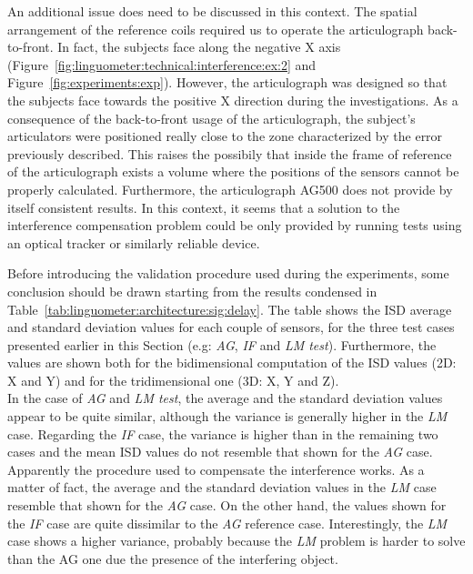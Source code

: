 
An additional issue does need to be discussed in this context. 
The spatial arrangement of the reference coils required us to operate the
articulograph back-to-front.
In fact, the subjects face along the negative X
axis (Figure~\ref{fig:linguometer:technical:interference:ex:2} and
Figure~\ref{fig:experiments:exp}).
However, the articulograph was designed so that the subjects face
towards the positive X direction during the investigations.
As a consequence of the back-to-front usage of the articulograph,
the subject's articulators were positioned really close to the zone
characterized by the error previously described.
This raises the possibily
that inside the frame of reference of the articulograph exists a volume where
the positions of the sensors cannot be properly calculated.
Furthermore, the articulograph AG500 does not provide by itself consistent
results. In this context, it seems that a solution to the
interference compensation problem could be only provided by running tests using
an optical tracker or similarly reliable device.

Before introducing the validation procedure used during the experiments, some
conclusion should be drawn starting from the results condensed in 
Table~\ref{tab:linguometer:architecture:sig:delay}.
The table shows the ISD average and standard deviation values for each couple
of sensors, for the three test cases presented earlier in this Section 
(e.g: \emph{AG}, \emph{IF} and \emph{LM test}).
Furthermore, the values are shown both for the bidimensional
computation of the ISD values (2D: X and Y) and for the tridimensional one (3D:
X, Y and Z).\\
In the case of \emph{AG} and \emph{LM test}, the average and the standard
deviation values appear to be quite similar, although the variance is generally
higher in the \emph{LM} case.
Regarding the \emph{IF} case, the variance is higher than in the remaining two
cases and the mean ISD values do not resemble that shown for the \emph{AG} case.
Apparently the procedure used to compensate the interference works.
As a matter of fact, the average and the standard deviation values in the
\emph{LM} case resemble that shown for the \emph{AG} case.
On the other hand, the values shown for the \emph{IF} case are quite 
dissimilar to the \emph{AG} reference case.
Interestingly, the \emph{LM} case shows a higher variance, probably because
the \emph{LM} problem is harder to solve than the AG one due the presence of
the interfering object.
